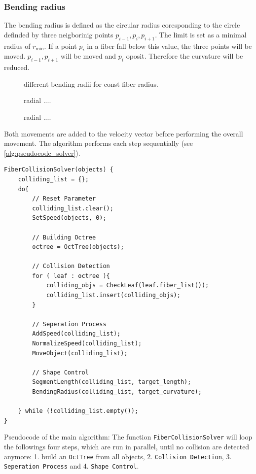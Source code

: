\subsubsection{Bending radius}
% 
The bending radius is defined as the circular radius coresponding to the circle definded by three neigborinig points $p_{i-1}, p_{i}, p_{i+1}$. 
The limit is set as a minimal radius of $r_{\min}$.
If a point $p_{i}$ in a fiber fall below this value, the three points will be moved.
$p_{i-1},p_{i+1}$ will be moved \dummy and $p_{i}$ oposit.
Therefore the curvature will be reduced.
% 
\begin{figure}[!tb]
    \centering
	\caption{different bending radii for const fiber radius.}
	\label{fig:model_radius}
\end{figure}
% 
\begin{figure}[!tb]
    \centering
	\caption{radial ....}
	\label{fig:model_circular}
\end{figure}
% 
\begin{figure}[!tb]
    \centering
	\caption{radial ....}
	\label{fig:model_circle_}
\end{figure}
% 
\newline
Both movements are added to the velocity vector before performing the overall movement.
The algorithm performs each step sequentially (see \cref{alg:pseudocode_solver}).
\begin{lstfloat}[!tb]
\lstset{style=cpp}

\begin{lstlisting}[]
FiberCollisionSolver(objects) {
	colliding_list = {};
	do{
		// Reset Parameter
		colliding_list.clear();
		SetSpeed(objects, 0);
		
		// Building Octree
		octree = OctTree(objects);
		
		// Collision Detection
		for ( leaf : octree ){
			colliding_objs = CheckLeaf(leaf.fiber_list());
			colliding_list.insert(colliding_objs);
		}
		
		// Seperation Process
		AddSpeed(colliding_list);
		NormalizeSpeed(colliding_list);
		MoveObject(colliding_list);
		
		// Shape Control
		SegmentLength(colliding_list, target_length);
		BendingRadius(colliding_list, target_curvature);
		
	} while (!colliding_list.empty());
}
\end{lstlisting}
\caption{Pseudocode of the main algorithm: The function \texttt{FiberCollisionSolver} will loop the followings four steps, which are run in parallel, until no collision are detected anymore: 1. build an \texttt{OctTree} from all objects, 2. \texttt{Collision Detection}, 3. \texttt{Seperation Process} and 4. \texttt{Shape Control}.}
\label{alg:pseudocode_solver}
\end{lstfloat}
